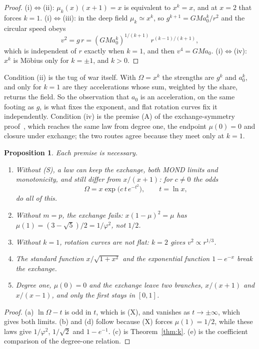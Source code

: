 \documentclass[twocolumn]{iopjournal}
\newtheorem{proposition}{Proposition}
\theoremstyle{definition}
\theoremstyle{remark}
\begin{document}
\begin{proof}
(i)$\Leftrightarrow$(ii): $\mu_k(x)(x+1) = x$ is equivalent to $x^k = x$,
and at $x = 2$ that forces $k = 1$. (i)$\Leftrightarrow$(iii): in the deep
field $\mu_k \simeq x^k$, so $g^{k+1} = GMa_0^k/r^2$ and the circular speed
obeys
\begin{equation}
  v^2 = g\,r = (GMa_0^k)^{1/(k+1)}\, r^{(k-1)/(k+1)},
\end{equation}
which is independent of $r$ exactly when $k = 1$, and then $v^4 = GMa_0$.
(i)$\Leftrightarrow$(iv): $x^k$ is Möbius only for $k = \pm 1$, and $k > 0$.
\end{proof}

Condition (ii) is the tug of war itself. With $\Omega = x^k$ the strengths
are $g^k$ and $a_0^k$, and only for $k = 1$ are they accelerations whose
sum, weighted by the share, returns the field. So the observation that
$a_0$ is an acceleration, on the same footing as $g$, is what fixes the
exponent, and flat rotation curves fix it independently. Condition (iv) is
the premise (A) of the exchange-symmetry proof~\cite{NelsonCL}, which
reaches the same law from degree one, the endpoint $\mu(0) = 0$ and
closure under exchange; the two routes agree because they meet only at
$k = 1$.

\begin{proposition}\label{prop:need}
Each premise is necessary.
\begin{enumerate}
\item[(a)] Without (S), a law can keep the exchange, both MOND limits
  and monotonicity, and still differ from $x/(x+1)$: for $c \ne 0$ the
  odds
  \[\Omega = x\exp\bigl(c\,t\,e^{-t^2}\bigr),\qquad t = \ln x,\]
  do all of this.
\item[(b)] Without $m = p$, the exchange fails: $x(1-\mu)^2 = \mu$ has
  $\mu(1) = (3-\sqrt5)/2 = 1/\varphi^2$, not $1/2$.
\item[(c)] Without $k = 1$, rotation curves are not flat: $k = 2$ gives
  $v^2 \propto r^{1/3}$.
\item[(d)] The standard function $x/\sqrt{1+x^2}$ and the exponential
  function $1 - e^{-x}$ break the exchange.
\item[(e)] Degree one, $\mu(0) = 0$ and the exchange leave two branches,
  $x/(x+1)$ and $x/(x-1)$, and only the first stays in $[0,1]$.
\end{enumerate}
\end{proposition}

\begin{proof}
(a) $\ln\Omega - t$ is odd in $t$, which is (X), and vanishes as
$t \to \pm\infty$, which gives both limits. (b) and (d) follow because (X)
forces $\mu(1) = 1/2$, while these laws give $1/\varphi^2$, $1/\sqrt2$ and
$1 - e^{-1}$. (c) is Theorem~\ref{thm:k}. (e) is the coefficient
comparison of the degree-one relation.
\end{proof}
\end{document}
